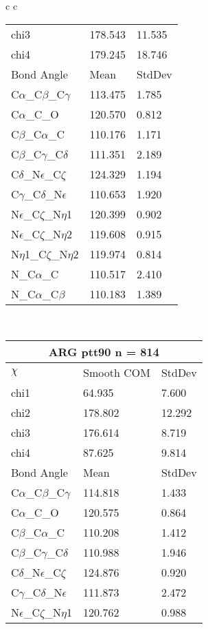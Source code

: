 \begin{longtable}{ c c }
\begin{tabular}{ l l l }
  chi3 & 178.543 & 11.535 \\ 
  chi4 & 179.245 & 18.746 \\ \midrule
  Bond Angle   & Mean     & StdDev \\ \midrule
  C$\alpha$\_C$\beta$\_C$\gamma$ & 113.475 & 1.785\\
  C$\alpha$\_C\_O & 120.570 & 0.812\\
  C$\beta$\_C$\alpha$\_C & 110.176 & 1.171\\
  C$\beta$\_C$\gamma$\_C$\delta$ & 111.351 & 2.189\\
  C$\delta$\_N$\epsilon$\_C$\zeta$ & 124.329 & 1.194\\
  C$\gamma$\_C$\delta$\_N$\epsilon$ & 110.653 & 1.920\\
  N$\epsilon$\_C$\zeta$\_N$\eta$1 & 120.399 & 0.902\\
  N$\epsilon$\_C$\zeta$\_N$\eta$2 & 119.608 & 0.915\\
  N$\eta$1\_C$\zeta$\_N$\eta$2 & 119.974 & 0.814\\
  N\_C$\alpha$\_C & 110.517 & 2.410\\
  N\_C$\alpha$\_C$\beta$ & 110.183 & 1.389\\
  \bottomrule
  \end{tabular}
  \\
  \begin{tabular}{ l l l }
  \toprule
  \multicolumn{3}{c}{ARG \textbf{ptt90} n = 814} \\ \toprule
  $\chi$       & Smooth COM & StdDev \\ \midrule
  chi1 & 64.935 & 7.600 \\ 
  chi2 & 178.802 & 12.292 \\ 
  chi3 & 176.614 & 8.719 \\ 
  chi4 & 87.625 & 9.814 \\ \midrule
  Bond Angle   & Mean     & StdDev \\ \midrule
  C$\alpha$\_C$\beta$\_C$\gamma$ & 114.818 & 1.433\\
  C$\alpha$\_C\_O & 120.575 & 0.864\\
  C$\beta$\_C$\alpha$\_C & 110.208 & 1.412\\
  C$\beta$\_C$\gamma$\_C$\delta$ & 110.988 & 1.946\\
  C$\delta$\_N$\epsilon$\_C$\zeta$ & 124.876 & 0.920\\
  C$\gamma$\_C$\delta$\_N$\epsilon$ & 111.873 & 2.472\\
  N$\epsilon$\_C$\zeta$\_N$\eta$1 & 120.762 & 0.988\\

\end{tabular}
\end{longtable}
